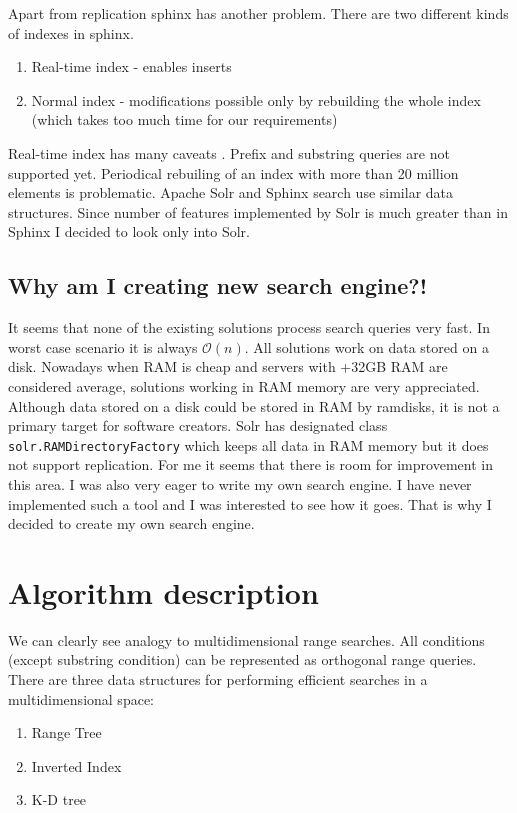 \documentclass[10pt,a4paper]{article}
\newcommand{\Oh}{\mathcal{O}}
\begin{document}
Apart from replication sphinx has another problem. There are two different kinds of indexes in sphinx.
\begin{enumerate}
\item Real-time index - enables inserts
\item Normal index - modifications possible only by rebuilding the whole index (which takes too much time for our requirements)
\end{enumerate}

Real-time index has many caveats \cite{SPHINXCAV}. Prefix and substring queries are not supported yet. Periodical rebuiling of an index with more than 20 million elements is problematic. Apache Solr and Sphinx search use similar data structures. Since number of features implemented by Solr is much greater than in Sphinx I decided to look only into Solr. 

\subsection{Why am I creating new search engine?!}
It seems that none of the existing solutions process search queries very fast. In worst case scenario it is always $\Oh(n)$. All solutions work on data stored on a disk. Nowadays when RAM is cheap and servers with +32GB RAM are considered average, solutions working in RAM memory are very appreciated. Although data stored on a disk could be stored in RAM by ramdisks, it is not a primary target for software creators. Solr has designated class \verb|solr.RAMDirectoryFactory| which keeps all data in RAM memory but it does not support replication. For me it seems that there is room for improvement in this area. I was also very eager to write my own search engine. I have never implemented such a tool and I was interested to see how it goes. That is why I decided to create my own search engine.  

\section{Algorithm description}
We can clearly see analogy to multidimensional range searches. All conditions (except substring condition) can be represented as orthogonal range queries. There are three data structures for performing efficient searches in a multidimensional space:

\begin{enumerate}
\item Range Tree \cite{CGAAA}
\item Inverted Index \cite{INVIND}
\item K-D tree \cite{CGAAA}
\end{enumerate}
\end{document}
